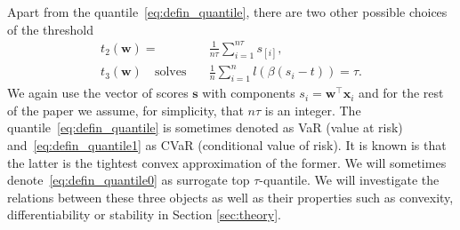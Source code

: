 Apart from the quantile~\eqref{eq:defin_quantile}, there are two other possible choices of the threshold
\begin{align}
  \label{eq:defin_quantile1} t_2(\bm{w}) =\ &\frac{1}{n\tau}\sum_{i=1}^{n\tau} s_{[i]}, \\
  \label{eq:defin_quantile0} t_3(\bm{w})\quad \text{solves} \quad & \frac{1}{n}\sum_{i = 1}^nl(\beta(s_i - t)) = \tau.
\end{align}
We again use the vector of scores $\bm{s}$ with components $s_i = \bm{w}^\top \bm{x}_i$ and for the rest of the paper we assume, for simplicity, that $n\tau$ is an integer. The quantile~\eqref{eq:defin_quantile} is sometimes denoted as VaR (value at risk) and~\eqref{eq:defin_quantile1} as CVaR (conditional value of risk). It is known is that the latter is the tightest convex approximation of the former. We will sometimes denote~\eqref{eq:defin_quantile0} as surrogate top $\tau$-quantile. We will investigate the relations between these three objects as well as their properties such as convexity, differentiability or stability in Section \ref{sec:theory}.

